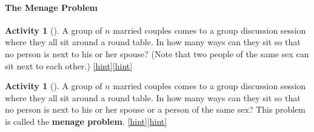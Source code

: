 \documentclass[10pt,]{book}
\newcommand{\terminology}[1]{\textbf{#1}}
\theoremstyle{plain}
\theoremstyle{definition}
\theoremstyle{definition}
\theoremstyle{definition}
\newtheorem{activity}[project]{Activity}
\numberwithin{equation}{chapter}
\begin{document}
\paragraph[{The Menage Problem}]{The Menage Problem}\hypertarget{sec-menage}{}
\begin{activity}[]\label{relaxedmenage}
\hypertarget{p-1208}{}%
A group of \(n\) married couples comes to a group discussion session where they all sit around a round table. In how many ways can they sit so that no person is next to his or her spouse? (Note that two people of the same sex can sit next to each other.)%
\hfill{\tiny\hyperlink{a-226}{[hint]}\hypertarget{q-226}{}}\hfill{\tiny\hyperlink{a-226}{[hint]}\hypertarget{q-226}{}}\end{activity}
\begin{activity}[]\label{activity-220}
\hypertarget{p-1212}{}%
A group of \(n\) married couples comes to a group discussion session where they all sit around a round table. In how many ways can they sit so that no person is next to his or her spouse or a person of the same sex? This problem is called the \terminology{menage problem}.%
\hfill{\tiny\hyperlink{a-227}{[hint]}\hypertarget{q-227}{}}\hfill{\tiny\hyperlink{a-227}{[hint]}\hypertarget{q-227}{}}\end{activity}
\typeout{************************************************}
\typeout{************************************************}
\end{document}
